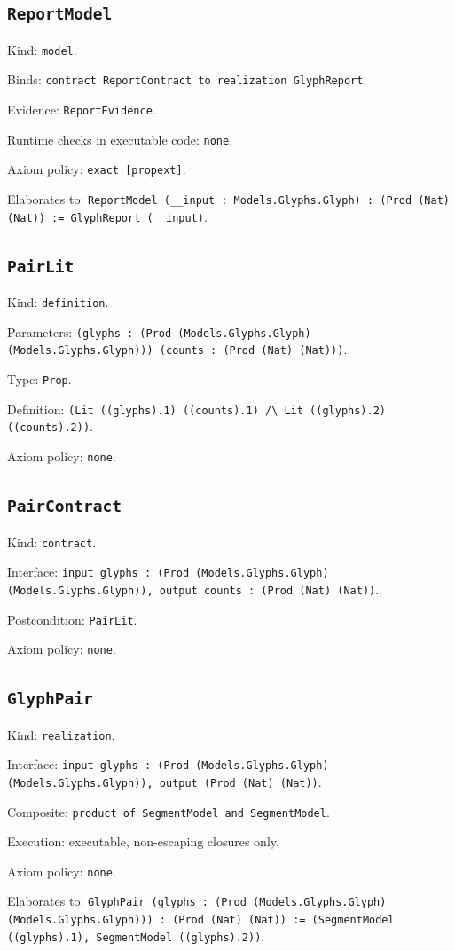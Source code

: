 \documentclass[11pt]{article}
\begin{document}
\subsection*{\texttt{ReportModel}}
\noindent Kind: \texttt{model}.\par
\noindent Binds: \texttt{contract ReportContract to realization GlyphReport}.\par
\noindent Evidence: \texttt{ReportEvidence}.\par
\noindent Runtime checks in executable code: \texttt{none}.\par
\noindent Axiom policy: \texttt{exact [propext]}.\par
\noindent Elaborates to: \texttt{ReportModel (\_\_input : Models.Glyphs.Glyph) : (Prod (Nat) (Nat)) := GlyphReport (\_\_input)}.\par
\subsection*{\texttt{PairLit}}
\noindent Kind: \texttt{definition}.\par
\noindent Parameters: \texttt{(glyphs : (Prod (Models.Glyphs.Glyph) (Models.Glyphs.Glyph))) (counts : (Prod (Nat) (Nat)))}.\par
\noindent Type: \texttt{Prop}.\par
\noindent Definition: \texttt{(Lit ((glyphs).1) ((counts).1) /\textbackslash{} Lit ((glyphs).2) ((counts).2))}.\par
\noindent Axiom policy: \texttt{none}.\par
\subsection*{\texttt{PairContract}}
\noindent Kind: \texttt{contract}.\par
\noindent Interface: \texttt{input glyphs : (Prod (Models.Glyphs.Glyph) (Models.Glyphs.Glyph)), output counts : (Prod (Nat) (Nat))}.\par
\noindent Postcondition: \texttt{PairLit}.\par
\noindent Axiom policy: \texttt{none}.\par
\subsection*{\texttt{GlyphPair}}
\noindent Kind: \texttt{realization}.\par
\noindent Interface: \texttt{input glyphs : (Prod (Models.Glyphs.Glyph) (Models.Glyphs.Glyph)), output (Prod (Nat) (Nat))}.\par
\noindent Composite: \texttt{product of SegmentModel and SegmentModel}.\par
\noindent Execution: executable, non-escaping closures only.\par
\noindent Axiom policy: \texttt{none}.\par
\noindent Elaborates to: \texttt{GlyphPair (glyphs : (Prod (Models.Glyphs.Glyph) (Models.Glyphs.Glyph))) : (Prod (Nat) (Nat)) := (SegmentModel ((glyphs).1), SegmentModel ((glyphs).2))}.\par
\end{document}
